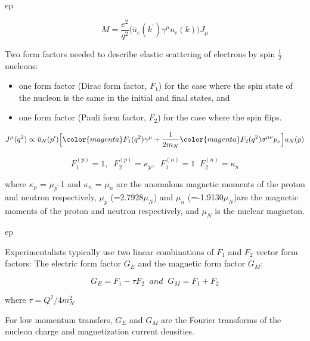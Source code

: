 \begin{frame}{ep}

\begin{equation*}
  M = \frac{e^2}{q^2} \Big( \bar{u}_{e}(k^{\prime}) \gamma^{\mu} u_{e}(k) \Big) J_{\mu}
\end{equation*}


Two form factors needed to describe elastic scattering of electrons by spin $\frac{1}{2}$ nucleons:
\begin{itemize}
 \item one form factor (Dirac form factor, $F_1$) for the case where the spin state of the nucleon is the same in the initial and final states, and
 \item one form factor (Pauli form factor, $F_2$) for the case where the spin flips.
\end{itemize}

\begin{equation*}
   J^{\mu}(q^2) \propto \bar{u}_{N}(p^{\prime}) \Big[
       {\color{magenta}F_{1}(q^2)}\gamma^{\mu} +
       \frac{1}{2m_{N}} {\color{magenta}F_{2}(q^2)}{\sigma}^{\mu\nu} p_{\nu}
      \Big] u_{N}(p)
\end{equation*}


\begin{equation*}
  F_{1}^{(p)} = 1,\;\;
  F_{2}^{(p)} = \kappa_{p},\;\;
  F_{1}^{(n)} = 1\;\;
  F_{2}^{(n)} = \kappa_{n}
\end{equation*}

where $\kappa_{p}$ = $\mu_{p}$-1 and $\kappa_{n}$ = $\mu_{n}$ are the anomalous magnetic moments of the proton and neutron respectively,
$\mu_{p}$ (=2.7928$\mu_{N}$) and $\mu_{n}$ (=-1.9130$\mu_{N}$)are the magnetic moments of the proton and neutron respectively,
and $\mu_{N}$ is the nuclear magneton.

\end{frame}

%
%
%

\begin{frame}{ep}

Experimentalists typically use two linear combinations of $F_{1}$ and $F_{2}$ vector form factors:
The electric form factor $G_{E}$ and the magnetic form factor $G_{M}$:

\begin{equation*}
  G_{E} = F_{1} - \tau F_{2} \;\; and \;\; G_{M} = F_{1} + F_{2}
\end{equation*}

where $\tau = Q^{2}/4m_{N}^{2}$

For low momentum transfers, $G_{E}$ and $G_{M}$ are the Fourier transforms of the
nucleon charge and magnetization current densities.

\end{frame}

